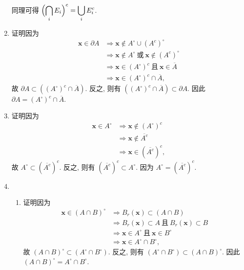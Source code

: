 \documentclass[a4paper, 11pt]{ctexart}
\begin{document}
\begin{enumerate}
        同理可得 $\displaystyle{\Bigl(\bigcap_i E_i\Bigr)^c = \bigcup_i E_i^c}$.
    \item %
        {\heiti 证明}\quad 因为
        \begin{align*}
            \boldsymbol{x} \in \partial{A} &\Rightarrow{} \boldsymbol{x} \notin A^\circ \cup (A^c)^\circ \\
            &\Rightarrow{} \boldsymbol{x} \notin A^\circ\ \text{或}\ \boldsymbol{x} \notin (A^c)^\circ \\
            &\Rightarrow{} \boldsymbol{x} \in (A^\circ)^c\ \text{且}\ \boldsymbol{x} \in \overline{A} \\
            &\Rightarrow{} \boldsymbol{x} \in (A^\circ)^c \cap \overline{A},
        \end{align*}
        故 $\partial{A} \subset ((A^\circ)^c \cap \overline{A})$. 反之, 则有 $((A^\circ)^c \cap \overline{A}) \subset \partial{A}$. 因此 $\partial{A} = (A^\circ)^c \cap \overline{A}$.
    \item %
        {\heiti 证明}\quad 因为
        \begin{align*}
            \boldsymbol{x} \in A^\circ &\Rightarrow \boldsymbol{x} \notin (A^\circ)^c \\
            &\Rightarrow \boldsymbol{x} \notin \overline{A^c} \\
            &\Rightarrow \boldsymbol{x} \in (\overline{A^c})^c,
        \end{align*}
        故 $A^\circ \subset (\overline{A^c})^c$. 反之, 则有 $(\overline{A^c})^c \subset A^\circ$. 因为 $A^\circ = (\overline{A^c})^c$.
    \item %
        \begin{enumerate}[(1)]
            \item %
                {\heiti 证明}\quad 因为
                \begin{align*}
                    \boldsymbol{x} \in (A \cap B)^\circ &\Rightarrow B_r(\boldsymbol{x}) \subset (A \cap B) \\
                    &\Rightarrow B_r(\boldsymbol{x}) \subset A\ \text{且}\ B_r(\boldsymbol{x}) \subset B \\
                    &\Rightarrow \boldsymbol{x} \in A^\circ\ \text{且}\ \boldsymbol{x} \in B^\circ \\
                    &\Rightarrow \boldsymbol{x} \in A^\circ \cap B^\circ,
                \end{align*}
                故 $(A \cap B)^\circ \subset (A^\circ \cap B^\circ)$. 反之, 则有 $(A^\circ \cap B^\circ) \subset (A \cap B)^\circ$. 因此 $(A \cap B)^\circ = A^\circ \cap B^\circ$.

\end{enumerate}
\end{enumerate}
\end{document}
